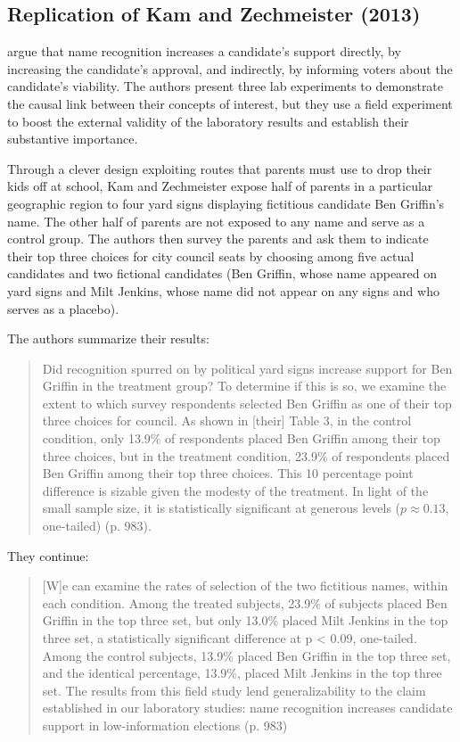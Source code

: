\documentclass[12pt]{article}
\begin{document}
\begin{appendix}
\section{Replication of Kam and Zechmeister (2013)}

\cite{KamZechmeister2013} argue that name recognition increases a candidate's support directly, by increasing the candidate's approval, and indirectly, by informing voters about the candidate's viability. The authors present three lab experiments to demonstrate the causal link between their concepts of interest, but they use a field experiment to boost the external validity of the laboratory results and establish their substantive importance. 

Through a clever design exploiting routes that parents must use to drop their kids off at school, Kam and Zechmeister expose half of parents in a particular geographic region to four yard signs displaying fictitious candidate Ben Griffin's name. The other half of parents are not exposed to any name and serve as a control group. The authors then survey the parents and ask them to indicate their top three choices for city council seats by choosing among five actual candidates and two fictional candidates (Ben Griffin, whose name appeared on yard signs and Milt Jenkins, whose name did not appear on any signs and who serves as a placebo). 

The authors summarize their results:

\begin{quote}
Did recognition spurred on by political yard signs increase support for Ben Griffin in the treatment group? To determine if this is so, we examine the extent to which survey respondents selected Ben Griffin as one of their top three choices for council. As shown in [their] Table 3, in the control condition, only 13.9\% of respondents placed Ben Griffin among their top three choices, but in the treatment condition, 23.9\% of respondents placed Ben Griffin among their top three choices. This 10 percentage point difference is sizable given the modesty of the treatment. In light of the small sample size, it is statistically significant at generous levels ($p \approx 0.13$, one-tailed) (p. 983).
\end{quote}

\noindent They continue:

\begin{quote}
[W]e can examine the rates of selection of the two fictitious names, within each condition. Among the treated subjects, 23.9\% of subjects placed Ben Griffin in the top three set, but only 13.0\% placed Milt Jenkins in the top three set, a statistically significant difference at p < 0.09, one-tailed. Among the control subjects, 13.9\% placed Ben Griffin in the top three set, and the identical percentage, 13.9\%, placed Milt Jenkins in the top three set. The results from this field study lend generalizability to the claim established in our laboratory studies: name recognition increases candidate support in low-information elections (p. 983)
\end{quote}


\end{appendix}
\end{document}
